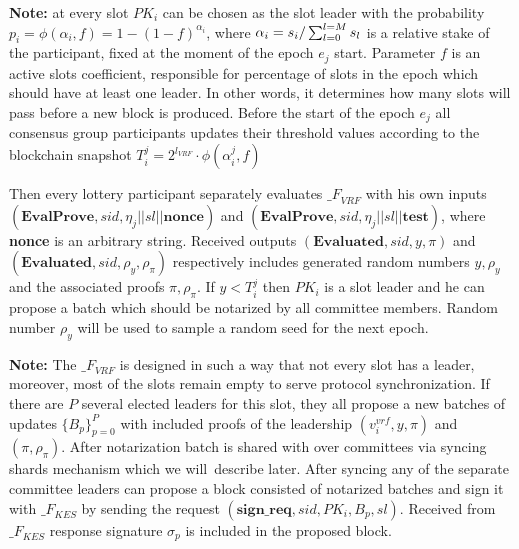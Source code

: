 \begin{legal}
\begin{legal}
        \textbf{Note:} at every slot $PK_i$ can be chosen as the slot leader with the probability ${p_i = \phi(\alpha_i, f) = 1-(1-f)^{\alpha_i}}$, where ${\alpha_i=s_i/\\\sum_{l=0}^{l=M} s_l}$ is a relative stake of the participant, fixed at the moment of the epoch $e_j$ start.
        Parameter $f$ is an active slots coefficient, responsible for percentage of slots in the epoch which should have at least one leader.
        In other words, it determines how many slots will pass before a new block is produced.
        Before the start of the epoch $e_j$ all consensus group participants updates their threshold values according to the blockchain snapshot ${T_i^j = 2^{l_{VRF}}\cdot \phi(\alpha_i^j, f)}$

        \item Then every lottery participant separately evaluates ${\mathcal_{F}}_{VRF}$ with his own inputs ${(\textbf{EvalProve}, sid, \eta_j || sl || \textbf{nonce})}$ and ${(\textbf{EvalProve}, sid, \eta_j || sl || \textbf{test})}$, where \textbf{nonce} is an arbitrary string.
        Received outputs ${(\textbf{Evaluated}, sid, y, \pi)}$ and ${(\textbf{Evaluated}, sid, \rho_y, \rho_\pi)}$ respectively includes generated random numbers ${y, \rho_y}$ and the associated proofs ${\pi, \rho_\pi}$.
        If ${y < T_i^j}$ then $PK_i$ is a slot leader and he can propose a batch which should be notarized by all committee members.
        Random number $\rho_y$ will be used to sample a random seed for the next epoch.

        \textbf{Note:} The ${\mathcal_{F}}_{VRF}$ is designed in such a way that not every slot has a leader, moreover, most of the slots remain empty to serve protocol synchronization.
        If there are $P$ several elected leaders for this slot, they all propose a new batches of updates $\{B_p\}_{p=0}^P$ with included proofs of the leadership ${(v_i^{vrf}, y, \pi)}$ and
        ${(\pi, \rho_\pi)}$.
        After notarization batch is shared with over committees via syncing shards mechanism which we will\
        describe later. After syncing any of the separate committee leaders can propose a block consisted of notarized batches and sign it with ${\mathcal_{F}}_{KES}$ by sending the request ${(\textbf{sign\_req}, sid, PK_i, B_p, sl)}$.
        Received from ${\mathcal_{F}}_{KES}$ response signature $\sigma_p$ is included in the proposed block.

    \end{legal}


\end{legal}
